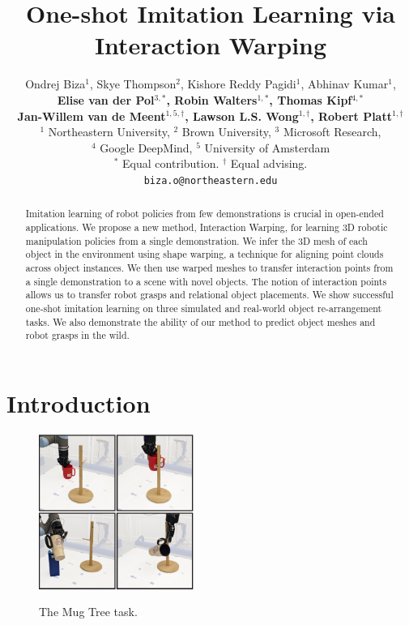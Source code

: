 \documentclass{article}
\title{One-shot Imitation Learning via Interaction Warping}
\author{
  Ondrej Biza$^1$, Skye Thompson$^2$, Kishore Reddy Pagidi$^1$, Abhinav Kumar$^1$, \\
  \textbf{Elise van der Pol$^{3,*}$, Robin Walters$^{1,*}$, Thomas Kipf$^{4,*}$} \\
  \textbf{Jan-Willem van de Meent$^{1,5,\dag}$, Lawson L.S. Wong$^{1,\dag}$, Robert Platt$^{1,\dag}$} \\
  $^1$ Northeastern University, $^2$ Brown University, $^3$ Microsoft Research, \\$^4$ Google DeepMind, $^5$ University of Amsterdam \\
  $^*$ Equal contribution. $^\dag$ Equal advising. \\
  \texttt{biza.o@northeastern.edu} \\
}
\begin{document}
\maketitle


\begin{abstract}
Imitation learning of robot policies from few demonstrations is crucial in open-ended applications. We propose a new method, Interaction Warping, for learning 3D robotic manipulation policies from a single demonstration. We infer the 3D mesh of each object in the environment using shape warping, a technique for aligning point clouds across object instances. We then use warped meshes to transfer interaction points from a single demonstration to a scene with novel objects. The notion of interaction points allows us to transfer robot grasps and relational object placements. We show successful one-shot imitation learning on three simulated and real-world object re-arrangement tasks. We also demonstrate the ability of our method to predict object meshes and robot grasps in the wild.
\end{abstract}



\section{Introduction}

\begin{figure}
\vspace{-0.5cm}
  \begin{center}
    \includegraphics[width=0.45\textwidth]{figures/intro_2.pdf} \\
    \end{center}
\vspace{-0.2cm}
\caption{The Mug Tree task.}
\label{fig:mugontree}
\end{figure}
\end{document}
